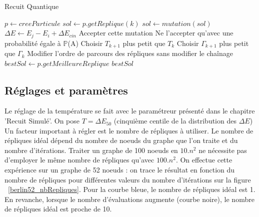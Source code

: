 \documentclass{article}%
\begin{document}
	\begin{algorithm}[!h] 
	\caption{Recuit Quantique}
	\begin{algorithmic}
	
	\STATE $p \leftarrow creeParticule$
			\STATE $sol \leftarrow p.getReplique(k) $
			\STATE $sol \leftarrow mutation( sol ) $
			\STATE $\Delta{E} \leftarrow E_j-E_i+\Delta{E_{cin}}$
				\STATE Accepter cette mutation	
			\ELSE 
				\STATE Ne l'accepter qu'avec une probabilité égale à $\mathbb{P}$(A)
			\ENDIF
			\STATE Choisir $T_{k+1}$ plus petit que $T_{k}$
			\STATE Choisir $\Gamma_{k+1}$ plus petit que $\Gamma_{k}$
			\STATE Modifier l'ordre de parcours des répliques sans modifier le chaînage
		\ENDFOR
	\ENDFOR
	\STATE $ bestSol \leftarrow p.getMeilleureReplique $
	\RETURN $ bestSol $
	
	\end{algorithmic}
	\end{algorithm}
		
		\vspace{1cm}

\subsection{Réglages et paramètres}

\vspace{1cm}

	Le réglage de la température se fait avec le paramétreur présenté dans le chapitre 'Recuit Simulé'. On pose $ T = \Delta E_{50} $ (cinquième centile de la distribution des $ \Delta E $)
	Un facteur important à régler est le nombre de répliques à utiliser. Le nombre de répliques idéal dépend du nombre de noeuds du graphe que l'on traite et du nombre d'itérations. Traiter un graphe de 100 noeuds en $ 10.n^2 $ ne nécessite pas d'employer le même nombre de répliques qu'avec $ 100.n^2 $. On effectue cette expérience sur un graphe de 52 noeuds : on trace le résultat en fonction du nombre de répliques pour différentes valeurs du nombre d'itérations sur la figure ~\ref{berlin52_nbRepliques}. Pour la courbe bleue, le nombre de répliques idéal est 1. En revanche, lorsque le nombre d'évaluations augmente (courbe noire), le nombre de répliques idéal est proche de 10.
	
\end{document}
